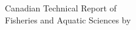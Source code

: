 \normalsize
{}
\thispagestyle{empty}
\noindent
\begin{center}
Canadian Technical Report of\\
Fisheries and Aquatic Sciences \trReportNum{}
\vfill
\trYear{}
\vfill
\MakeTextUppercase{\trTitle{}}
\vfill
by
\vfill
\trAuthsLong{}
\vfill
\trAddy{}
\end{center}
\clearpage
